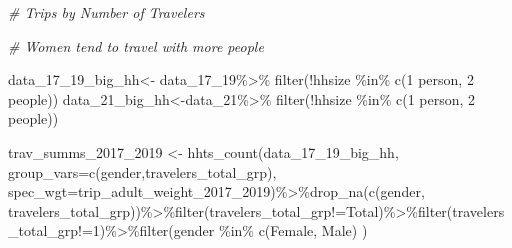 \documentclass[
  12pt,
]{article}
\newenvironment{Shaded}{\begin{snugshade}}{\end{snugshade}}
\newcommand{\AttributeTok}[1]{\textcolor[rgb]{0.77,0.63,0.00}{#1}}
\newcommand{\CommentTok}[1]{\textcolor[rgb]{0.56,0.35,0.01}{\textit{#1}}}
\newcommand{\FunctionTok}[1]{\textcolor[rgb]{0.00,0.00,0.00}{#1}}
\newcommand{\NormalTok}[1]{#1}
\newcommand{\OtherTok}[1]{\textcolor[rgb]{0.56,0.35,0.01}{#1}}
\newcommand{\SpecialCharTok}[1]{\textcolor[rgb]{0.00,0.00,0.00}{#1}}
\newcommand{\StringTok}[1]{\textcolor[rgb]{0.31,0.60,0.02}{#1}}
\begin{document}
\begin{Shaded}
\begin{Highlighting}[]
\CommentTok{\# Trips by Number of Travelers}

\CommentTok{\# Women tend to travel with more people}

\NormalTok{data\_17\_19\_big\_hh}\OtherTok{\textless{}{-}}\NormalTok{ data\_17\_19}\SpecialCharTok{\%\textgreater{}\%}
  \FunctionTok{filter}\NormalTok{(}\SpecialCharTok{!}\NormalTok{hhsize }\SpecialCharTok{\%in\%} \FunctionTok{c}\NormalTok{(}\StringTok{\textquotesingle{}1 person\textquotesingle{}}\NormalTok{, }\StringTok{\textquotesingle{}2 people\textquotesingle{}}\NormalTok{))}
\NormalTok{data\_21\_big\_hh}\OtherTok{\textless{}{-}}\NormalTok{data\_21}\SpecialCharTok{\%\textgreater{}\%}
  \FunctionTok{filter}\NormalTok{(}\SpecialCharTok{!}\NormalTok{hhsize }\SpecialCharTok{\%in\%} \FunctionTok{c}\NormalTok{(}\StringTok{\textquotesingle{}1 person\textquotesingle{}}\NormalTok{, }\StringTok{\textquotesingle{}2 people\textquotesingle{}}\NormalTok{))}

\NormalTok{trav\_summs\_2017\_2019 }\OtherTok{\textless{}{-}} \FunctionTok{hhts\_count}\NormalTok{(data\_17\_19\_big\_hh,}
                                        \AttributeTok{group\_vars=}\FunctionTok{c}\NormalTok{(}\StringTok{\textquotesingle{}gender\textquotesingle{}}\NormalTok{,}\StringTok{\textquotesingle{}travelers\_total\_grp\textquotesingle{}}\NormalTok{),}
                                        \AttributeTok{spec\_wgt=}\StringTok{\textquotesingle{}trip\_adult\_weight\_2017\_2019\textquotesingle{}}\NormalTok{)}\SpecialCharTok{\%\textgreater{}\%}\FunctionTok{drop\_na}\NormalTok{(}\FunctionTok{c}\NormalTok{(}\StringTok{\textquotesingle{}gender\textquotesingle{}}\NormalTok{, }\StringTok{\textquotesingle{}travelers\_total\_grp\textquotesingle{}}\NormalTok{))}\SpecialCharTok{\%\textgreater{}\%}\FunctionTok{filter}\NormalTok{(travelers\_total\_grp}\SpecialCharTok{!=}\StringTok{\textquotesingle{}Total\textquotesingle{}}\NormalTok{)}\SpecialCharTok{\%\textgreater{}\%}\FunctionTok{filter}\NormalTok{(travelers\_total\_grp}\SpecialCharTok{!=}\StringTok{\textquotesingle{}1\textquotesingle{}}\NormalTok{)}\SpecialCharTok{\%\textgreater{}\%}\FunctionTok{filter}\NormalTok{(gender }\SpecialCharTok{\%in\%} \FunctionTok{c}\NormalTok{(}\StringTok{\textquotesingle{}Female\textquotesingle{}}\NormalTok{, }\StringTok{\textquotesingle{}Male\textquotesingle{}}\NormalTok{) )}


\end{Highlighting}
\end{Shaded}
\end{document}
